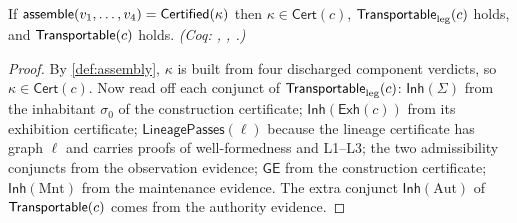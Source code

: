 \begin{prop}\label{prop:certsound}
If $\mathsf{assemble}(v_1,\dots,v_4) = \mathsf{Certified}(\kappa)$ then $\kappa \in \mathsf{Cert}(c)$, $\mathsf{Transportable}_{\mathrm{leg}}(c)$ holds, and $\mathsf{Transportable}(c)$ holds. \emph{(Coq: , , .)}
\end{prop}
\begin{proof}
By \cref{def:assembly}, $\kappa$ is built from four discharged component verdicts, so $\kappa \in \mathsf{Cert}(c)$. Now read off each conjunct of $\mathsf{Transportable}_{\mathrm{leg}}(c)$: $\mathsf{Inh}(\Sigma)$ from the inhabitant $\sigma_0$ of the construction certificate; $\mathsf{Inh}(\mathsf{Exh}(c))$ from its exhibition certificate; $\mathsf{LineagePasses}(\ell)$ because the lineage certificate has graph $\ell$ and carries proofs of well-formedness and L1--L3; the two admissibility conjuncts from the observation evidence; $\mathsf{GE}$ from the construction certificate; $\mathsf{Inh}(\mathrm{Mnt})$ from the maintenance evidence. The extra conjunct $\mathsf{Inh}(\mathrm{Aut})$ of $\mathsf{Transportable}(c)$ comes from the authority evidence.
\end{proof}

